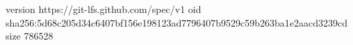 version https://git-lfs.github.com/spec/v1
oid sha256:5d68c205d34c6407bf156e198123ad7796407b9529c59b263ba1e2aacd3239cd
size 786528
